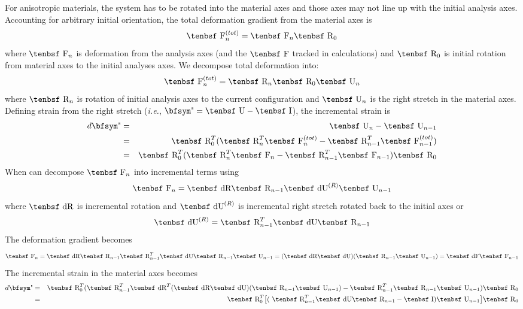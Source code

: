 \documentclass[11pt]{book}
\def\F{\hbox{\tenbsf F}}
\def\dF{\hbox{\tenbsf dF}}
\def\I{\hbox{\tenbsf I}}
\def\R{\hbox{\tenbsf R}}
\def\dR{\hbox{\tenbsf dR}}
\def\U{\hbox{\tenbsf U}}
\def\dU{\hbox{\tenbsf dU}}
\def\et{{\hbox{\bfsym\char'042}}}
\begin{document}
For anisotropic materials, the system has to be rotated into the material axes and those axes may not line up with the initial analysis axes. Accounting for arbitrary initial orientation, the total deformation gradient from the material axes is
\begin{equation}
   \F_n^{(tot)} = \F_n\R_0
\end{equation}
where $\F_n$ is deformation from the analysis axes (and the $\F$ tracked in calculations) and $\R_0$ is initial rotation from material axes to the initial analyses axes. We decompose total deformation into:
\begin{equation}
   \F_n^{(tot)} = \R_n\R_0\U_n
\end{equation}
where $\R_n$ is rotation of initial analysis axes to the current configuration and $\U_n$ is the right stretch in the material axes. Defining strain from the right stretch (\emph{i.e.}, $\et=\U-\I$), the incremental strain is
\begin{eqnarray}
     d\et & = & \U_n - \U_{n-1} \\
     & = & \R_0^T(\R_n^T\F_n^{(tot)} - \R_{n-1}^T\F_{n-1}^{(tot)} )\\
     & = & \R_0^T(\R_n^T\F_n - \R_{n-1}^T\F_{n-1})\R_0 
\end{eqnarray}
When can decompose $\F_n$ into incremental terms using
\begin{equation}
   \F_n = \dR\R_{n-1}\dU^{(R)}\U_{n-1}
\end{equation}
where $\dR$ is incremental rotation and $\dU^{(R)}$ is incremental right stretch rotated back to the initial axes or 
\begin{equation}
   \dU^{(R)} =  \R_{n-1}^T \dU \R_{n-1}
\end{equation}
The deformation gradient becomes
\begin{equation}
   \F_n = \dR\R_{n-1} \R_{n-1}^T \dU \R_{n-1}\U_{n-1} =( \dR\dU)( \R_{n-1}\U_{n-1}) =  \dF \F_{n-1}
\end{equation}
The incremental strain in the material axes becomes
\begin{eqnarray}
     d\et & = &  \R_0^T(\R_{n-1}^T\dR^T( \dR\dU)( \R_{n-1}\U_{n-1})  - \R_{n-1}^T\R_{n-1}\U_{n-1})\R_0 \\
     	& = &  \R_0^T\bigl[(\ \R_{n-1}^T \dU \R_{n-1} - \I)\U_{n-1}\bigr]\R_0 
\end{eqnarray}
\end{document}
